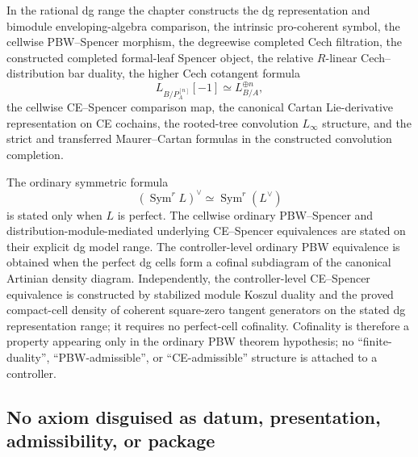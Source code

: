 In the rational dg range the chapter constructs the dg representation and
bimodule enveloping-algebra comparison, the intrinsic pro-coherent symbol, the
cellwise PBW--Spencer morphism, the degreewise completed Cech filtration,
the constructed completed formal-leaf Spencer object, the
relative $R$-linear Cech--distribution bar duality, the higher Cech cotangent formula
\[
    L_{B/P_A^{[n]}}[-1]
    \simeq
    L_{B/A}^{\oplus n},
\]
the cellwise CE--Spencer comparison map, the canonical Cartan
Lie-derivative representation on CE cochains, the rooted-tree convolution
$L_\infty$ structure, and the strict and transferred Maurer--Cartan formulas
in the constructed convolution completion.

The ordinary symmetric formula
\[
    \left(
        \operatorname{Sym}^rL
    \right)^\vee
    \simeq
    \operatorname{Sym}^r(L^\vee)
\]
is stated only when $L$ is perfect.  The cellwise ordinary PBW--Spencer and
distribution-module-mediated underlying CE--Spencer equivalences are stated on their explicit
dg model range.  The controller-level ordinary PBW equivalence is obtained
when the perfect dg cells form a cofinal subdiagram of the canonical Artinian
density diagram.  Independently, the controller-level CE--Spencer
equivalence is constructed by stabilized module Koszul duality and the proved
compact-cell density of coherent square-zero tangent generators on the stated
dg representation range; it requires no perfect-cell cofinality.  Cofinality
is therefore a property appearing only in the ordinary PBW theorem
hypothesis; no ``finite-duality'', ``PBW-admissible'', or ``CE-admissible''
structure is attached to a controller.

\subsection{No axiom disguised as datum, presentation, admissibility, or package}

